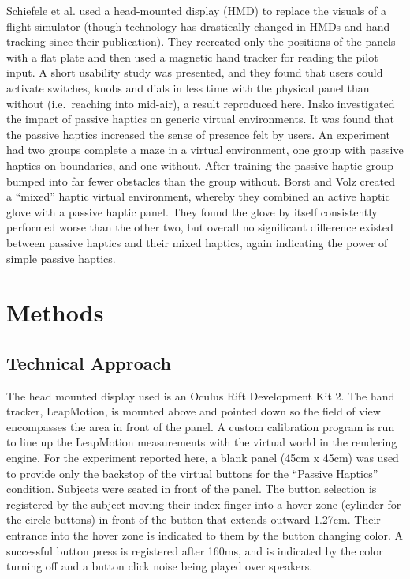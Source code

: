 \documentclass[]{aiaa-tc}%
\begin{document}
Schiefele et al.\cite{shiefele} used a head-mounted display (HMD) to replace the visuals of a flight simulator (though technology has drastically changed in HMDs and hand tracking since their publication).
They recreated only the positions of the panels with a flat plate and then used a magnetic hand tracker for reading the pilot input.
A short usability study was presented, and they found that users could activate switches, knobs and dials in less time with the physical panel than without (i.e.\ reaching into mid-air), a result reproduced here.
Insko\cite{insko} investigated the impact of passive haptics on generic virtual environments.
It was found that the passive haptics increased the sense of presence felt by users.
An experiment had two groups complete a maze in a virtual environment, one group with passive haptics on boundaries, and one without.
After training the passive haptic group bumped into far fewer obstacles than the group without.
Borst and Volz\cite{borst} created a ``mixed'' haptic virtual environment, whereby they combined an active haptic glove with a passive haptic panel.
They found the glove by itself consistently performed worse than the other two, but overall no significant difference existed between passive haptics and their mixed haptics, again indicating the power of simple passive haptics.

\section{Methods}
\subsection{Technical Approach}
The head mounted display used is an Oculus Rift Development Kit 2.
The hand tracker, LeapMotion, is mounted above and pointed down so the field of view encompasses the area in front of the panel.
A custom calibration program is run to line up the LeapMotion measurements with the virtual world in the rendering engine.
For the experiment reported here, a blank panel (45cm x 45cm) was used to provide only the backstop of the virtual buttons for the ``Passive Haptics'' condition.
Subjects were seated in front of the panel.
The button selection is registered by the subject moving their index finger into a hover zone (cylinder for the circle buttons) in front of the button that extends outward 1.27cm.
Their entrance into the hover zone is indicated to them by the button changing color.
A successful button press is registered after 160ms, and is indicated by the color turning off and a button click noise being played over speakers.
\end{document}

